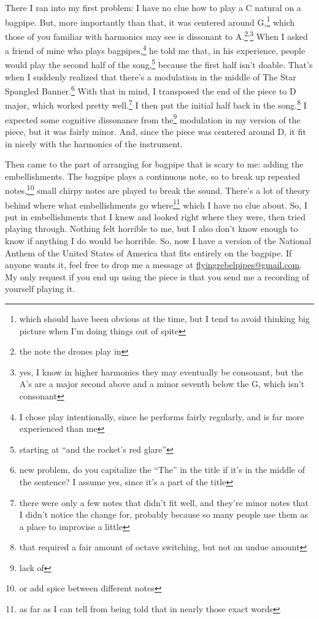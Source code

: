\documentclass[12pt]{article}[titlepage]
\newcommand{\say}[1]{``#1''}
\newcommand{\1}{\={a}}
\newcommand{\2}{\={e}}
\newcommand{\3}{\={\i}}
\newcommand{\4}{\=o}
\newcommand{\5}{\=u}
\newcommand{\6}{\={A}}
\renewcommand{\,}{\textsuperscript{,}}
\begin{document}
There I ran into my first problem: I have no clue how to play a C natural on a bagpipe.
But, more importantly than that, it was centered around G,\footnote{which should have been obvious at the time, but I tend to avoid thinking big picture when I'm doing things out of spite} which those of you familiar with harmonics may see is dissonant to A.\footnote{the note the drones play in}\,\footnote{yes, I know in higher harmonics they may eventually be consonant, but the A's are a major second above and a minor seventh below the G, which isn't consonant}
When I asked a friend of mine who plays bagpipes,\footnote{I chose play intentionally, since he performs fairly regularly, and is far more experienced than me} he told me that, in his experience, people would play the second half of the song,\footnote{starting at \say{and the rocket's red glare}} because the first half isn't doable.
That's when I suddenly realized that there's a modulation in the middle of The Star Spangled Banner.\footnote{new problem, do you capitalize the \say{The} in the title if it's in the middle of the sentence? I assume yes, since it's a part of the title}
With that in mind, I transposed the end of the piece to D major, which worked pretty well.\footnote{there were only a few notes that didn't fit well, and they're minor notes that I didn't notice the change for, probably because so many people use them as a place to improvise a little}
I then put the initial half back in the song.\footnote{that required a fair amount of octave switching, but not an undue amount}
I expected some cognitive dissonance from the\footnote{lack of} modulation in my version of the piece, but it was fairly minor.
And, since the piece was centered around D, it fit in nicely with the harmonics of the instrument.

Then came to the part of arranging for bagpipe that is scary to me: adding the embellishments.
The bagpipe plays a continuous note, so to break up repeated notes,\footnote{or add spice between different notes} small chirpy notes are played to break the sound.
There's a lot of theory behind where what embellishments go where\footnote{as far as I can tell from being told that in nearly those exact words} which I have no clue about.
So, I put in embellishments that I knew and looked right where they were, then tried playing through.
Nothing felt horrible to me, but I also don't know enough to know if anything I do would be horrible.
So, now I have a version of the National Anthem of the United States of America that fits entirely on the bagpipe.
If anyone wants it, feel free to drop me a message at \href{mailto:flyingrebelpipes@gmail.com}{flyingrebelpipes@gmail.com}.
My only request if you end up using the piece is that you send me a recording of yourself playing it.
\end{document}

